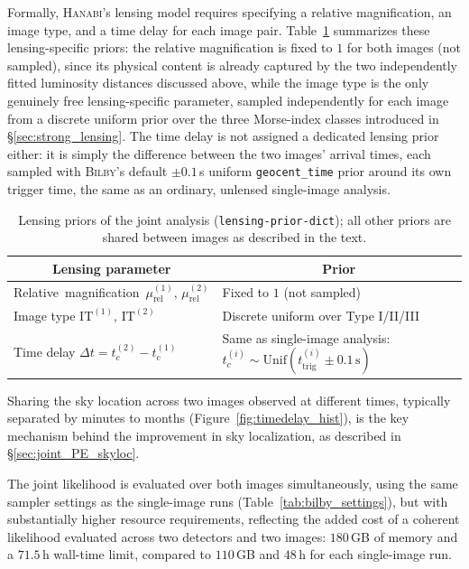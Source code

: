 Formally, \textsc{Hanabi}'s lensing model requires specifying a relative magnification, an image type, and a time delay for each image pair. Table~\ref{tab:hanabi_lensing_priors} summarizes these lensing-specific priors: the relative magnification is fixed to $1$ for both images (not sampled), since its physical content is already captured by the two independently fitted luminosity distances discussed above, while the image type is the only genuinely free lensing-specific parameter, sampled independently for each image from a discrete uniform prior over the three Morse-index classes introduced in \S\ref{sec:strong_lensing}. The time delay is not assigned a dedicated lensing prior either: it is simply the difference between the two images' arrival times, each sampled with \textsc{Bilby}'s default $\pm0.1$\,s uniform \texttt{geocent\_time} prior around its own trigger time, the same as an ordinary, unlensed single-image analysis.

\begin{table}[h!]
\centering
\renewcommand{\arraystretch}{1.2}
\begin{tabular}{m{6cm}m{9cm}}
\hline\hline
\multicolumn{1}{c}{Lensing parameter} & \multicolumn{1}{c}{Prior} \\
\hline
\addlinespace[4pt]
\mbox{Relative magnification $\mu_\mathrm{rel}^{(1)},\,\mu_\mathrm{rel}^{(2)}$} & Fixed to $1$ (not sampled) \\
Image type $\mathrm{IT}^{(1)},\,\mathrm{IT}^{(2)}$ & Discrete uniform over Type I/II/III \\
Time delay $\Delta t = t_c^{(2)}-t_c^{(1)}$ & Same as single-image analysis: $t_c^{(i)}\sim\mathrm{Unif}(t_\mathrm{trig}^{(i)}\pm0.1\,\mathrm{s})$ \\
\hline
\end{tabular}
\caption{Lensing priors of the joint analysis (\texttt{lensing-\allowbreak prior-\allowbreak dict}); all other priors are shared between images as described in the text.}
\label{tab:hanabi_lensing_priors}
\end{table}

Sharing the sky location across two images observed at different times, typically separated by minutes to months (Figure~\ref{fig:timedelay_hist}), is the key mechanism behind the improvement in sky localization, as described in \S\ref{sec:joint_PE_skyloc}.

The joint likelihood is evaluated over both images simultaneously, using the same sampler settings as the single-image runs (Table~\ref{tab:bilby_settings}), but with substantially higher resource requirements, reflecting the added cost of a coherent likelihood evaluated across two detectors and two images: $180$\,GB of memory and a $71.5$\,h wall-time limit, compared to $110$\,GB and $48$\,h for each single-image run.


